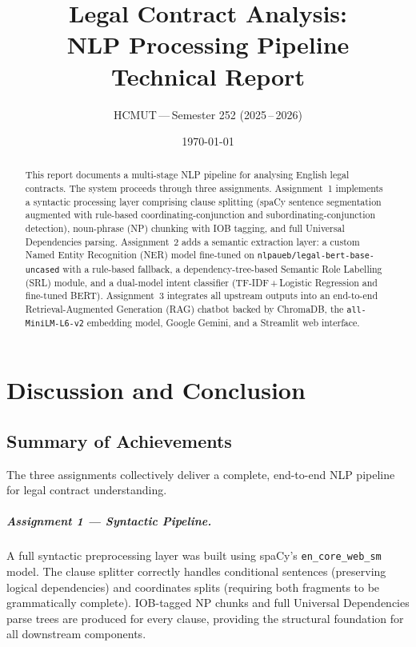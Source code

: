 \documentclass[12pt,a4paper]{report}
\title{%
    \vspace{-1cm}
    \textbf{Legal Contract Analysis:}\\[6pt]
    \textbf{NLP Processing Pipeline}\\[12pt]
    \large Technical Report
}
\author{HCMUT\,---\,Semester 252 (2025\,--\,2026)}
\date{\today}
\begin{document}
\maketitle
\thispagestyle{empty}

\vspace{1cm}
\begin{abstract}
    This report documents a multi-stage NLP pipeline for analysing English legal
    contracts.  The system proceeds through three assignments.  Assignment~1
    implements a syntactic processing layer comprising clause splitting (spaCy
    sentence segmentation augmented with rule-based coordinating-conjunction and
    subordinating-conjunction detection), noun-phrase (NP) chunking with IOB
    tagging, and full Universal Dependencies parsing.  Assignment~2 adds a semantic
    extraction layer: a custom Named Entity Recognition (NER) model fine-tuned on
    \texttt{nlpaueb/legal-bert-base-uncased} with a rule-based fallback, a
    dependency-tree-based Semantic Role Labelling (SRL) module, and a dual-model
    intent classifier (TF-IDF\,+\,Logistic Regression and fine-tuned BERT).
    Assignment~3 integrates all upstream outputs into an end-to-end
    Retrieval-Augmented Generation (RAG) chatbot backed by ChromaDB, the
    \texttt{all-MiniLM-L6-v2} embedding model, Google Gemini, and a Streamlit web
    interface.
\end{abstract}

\newpage
\tableofcontents
\clearpage
{}
\hypersetup{pageanchor=true}



\newpage


\newpage


\newpage
\chapter{Discussion and Conclusion}
\label{chap:discussion}

\section{Summary of Achievements}
\label{sec:achievements}

The three assignments collectively deliver a complete, end-to-end NLP pipeline
for legal contract understanding.

\paragraph{Assignment 1 — Syntactic Pipeline.}
A full syntactic preprocessing layer was built using spaCy's
\texttt{en\_core\_web\_sm} model.  The clause splitter correctly handles
conditional sentences (preserving logical dependencies) and coordinates splits
(requiring both fragments to be grammatically complete).  IOB-tagged NP chunks
and full Universal Dependencies parse trees are produced for every clause,
providing the structural foundation for all downstream components.
\end{document}
